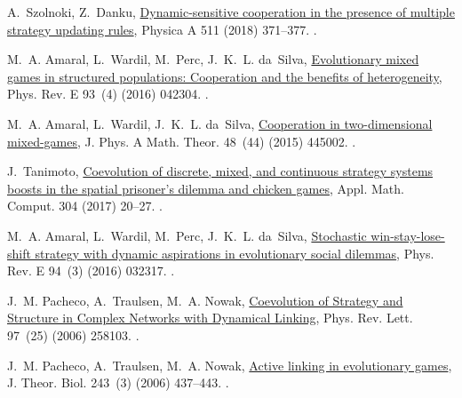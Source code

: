 \documentclass[5p,review]{elsarticle}
\begin{document}
\begin{thebibliography}{10}
A.~Szolnoki, Z.~Danku,
  \href{https://linkinghub.elsevier.com/retrieve/pii/S0378437118309476
  https://doi.org/10.1016/j.physa.2018.08.007}{{Dynamic-sensitive cooperation
  in the presence of multiple strategy updating rules}}, Physica A 511 (2018)
  371--377.
\newblock \href {http://dx.doi.org/10.1016/j.physa.2018.08.007}
  {}.

M.~A. Amaral, L.~Wardil, M.~Perc, J.~K.~L. da~Silva,
  \href{http://link.aps.org/doi/10.1103/PhysRevE.93.042304}{{Evolutionary mixed
  games in structured populations: Cooperation and the benefits of
  heterogeneity}}, Phys. Rev. E 93~(4) (2016) 042304.
\newblock \href {http://dx.doi.org/10.1103/PhysRevE.93.042304}
  {}.

M.~A. Amaral, L.~Wardil, J.~K.~L. da~Silva,
  \href{http://stacks.iop.org/1751-8121/48/i=44/a=445002?key=crossref.5d12abaa9d93d27016b1adbf9be62761}{{Cooperation in two-dimensional mixed-games}}, J. Phys. A Math. Theor. 48~(44) (2015) 445002.
\newblock \href {http://dx.doi.org/10.1088/1751-8113/48/44/445002}
  {}.

J.~Tanimoto,
  \href{https://linkinghub.elsevier.com/retrieve/pii/S0096300317300231}{{Coevolution  of discrete, mixed, and continuous strategy systems boosts in the spatial  prisoner's dilemma and chicken games}}, Appl. Math. Comput. 304 (2017) 20--27.
\newblock \href {http://dx.doi.org/10.1016/j.amc.2017.01.015}
  {}.

M.~A. Amaral, L.~Wardil, M.~Perc, J.~K.~L. da~Silva,
  \href{http://link.aps.org/doi/10.1103/PhysRevE.94.032317}{{Stochastic
  win-stay-lose-shift strategy with dynamic aspirations in evolutionary social dilemmas}}, Phys. Rev. E 94~(3) (2016) 032317.
\newblock \href {http://dx.doi.org/10.1103/PhysRevE.94.032317}
  {}.

J.~M. Pacheco, A.~Traulsen, M.~A. Nowak,
  \href{http://link.aps.org/doi/10.1103/PhysRevLett.97.258103}{{Coevolution of
  Strategy and Structure in Complex Networks with Dynamical Linking}}, Phys.
  Rev. Lett. 97~(25) (2006) 258103.
\newblock \href {http://dx.doi.org/10.1103/PhysRevLett.97.258103}
  {}.

J.~M. Pacheco, A.~Traulsen, M.~A. Nowak,
  \href{http://www.sciencedirect.com/science/article/pii/S0022519306002736}{{Active
  linking in evolutionary games}}, J. Theor. Biol. 243~(3) (2006) 437--443.
\newblock \href {http://dx.doi.org/10.1016/j.jtbi.2006.06.027}
  {}.


\end{thebibliography}
\end{document}
